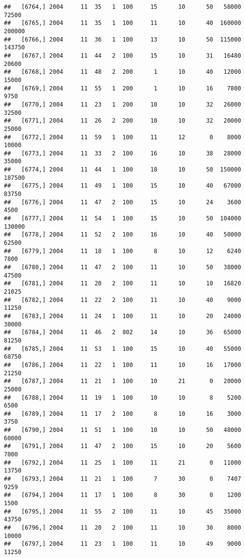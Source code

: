 \documentclass{article}\usepackage[]{graphicx}\usepackage[]{color}
\makeatletter
\newenvironment{kframe}{%
 \def\at@end@of@kframe{}%
 \ifinner\ifhmode%
  \def\at@end@of@kframe{\end{minipage}}%
  \begin{minipage}{\columnwidth}%
 \fi\fi%
 \def\FrameCommand##1{\hskip\@totalleftmargin \hskip-\fboxsep
 \colorbox{shadecolor}{##1}\hskip-\fboxsep
     \hskip-\linewidth \hskip-\@totalleftmargin \hskip\columnwidth}%
 \MakeFramed {\advance\hsize-\width
   \@totalleftmargin\z@ \linewidth\hsize
   \@setminipage}}%
 {\par\unskip\endMakeFramed%
 \at@end@of@kframe}
\newenvironment{knitrout}{}{} %
\makeatother
\begin{document}
\begin{knitrout}
\begin{kframe}
\begin{verbatim}
##   [6764,] 2004     11  35   1  100     15      10      50   58000   72500
##   [6765,] 2004     11  35   1  100     11      10      40  160000  200000
##   [6766,] 2004     11  36   1  100     13      10      50  115000  143750
##   [6767,] 2004     11  44   2  100     15      10      31   16480   20600
##   [6768,] 2004     11  48   2  200      1      10      40   12000   15000
##   [6769,] 2004     11  55   1  200      1      10      16    7800    9750
##   [6770,] 2004     11  23   1  200     10      10      32   26000   32500
##   [6771,] 2004     11  26   2  200     10      10      32   20000   25000
##   [6772,] 2004     11  59   1  100     11      12       0    8000   10000
##   [6773,] 2004     11  33   2  100     16      10      38   28000   35000
##   [6774,] 2004     11  44   1  100     18      10      50  150000  187500
##   [6775,] 2004     11  49   1  100     15      10      40   67000   83750
##   [6776,] 2004     11  47   2  100     15      10      24    3600    4500
##   [6777,] 2004     11  54   1  100     15      10      50  104000  130000
##   [6778,] 2004     11  52   2  100     16      10      40   50000   62500
##   [6779,] 2004     11  18   1  100      8      10      12    6240    7800
##   [6780,] 2004     11  47   2  100     11      10      50   38000   47500
##   [6781,] 2004     11  20   2  100     11      10      10   16820   21025
##   [6782,] 2004     11  22   2  100     11      10      40    9000   11250
##   [6783,] 2004     11  24   1  100     11      10      20   24000   30000
##   [6784,] 2004     11  46   2  802     14      10      36   65000   81250
##   [6785,] 2004     11  53   1  100     15      10      40   55000   68750
##   [6786,] 2004     11  22   1  100     11      10      16   17000   21250
##   [6787,] 2004     11  21   1  100     10      21       0   20000   25000
##   [6788,] 2004     11  19   1  100     10      10       8    5200    6500
##   [6789,] 2004     11  17   2  100      8      10      16    3000    3750
##   [6790,] 2004     11  51   1  100     10      10      50   48000   60000
##   [6791,] 2004     11  47   2  100     15      10      20    5600    7000
##   [6792,] 2004     11  25   1  100     11      21       0   11000   13750
##   [6793,] 2004     11  21   1  100      7      30       0    7407    9259
##   [6794,] 2004     11  17   1  100      8      30       0    1200    1500
##   [6795,] 2004     11  55   2  100     11      10      45   35000   43750
##   [6796,] 2004     11  20   2  100     11      10      30    8000   10000
##   [6797,] 2004     11  23   1  100     11      10      49    9000   11250

\end{verbatim}
\end{kframe}
\end{knitrout}
\end{document}
